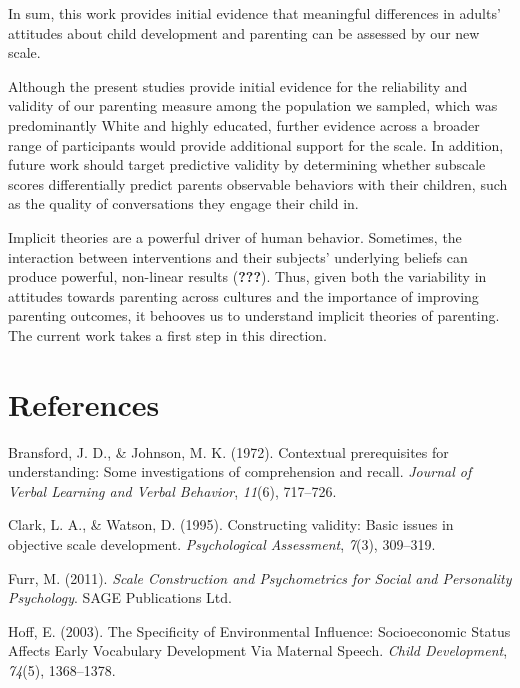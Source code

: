 \documentclass[floatsintext,man]{apa6}
\theoremstyle{definition}
\theoremstyle{definition}
\theoremstyle{definition}
\theoremstyle{remark}
\begin{document}
In sum, this work provides initial evidence that meaningful differences
in adults' attitudes about child development and parenting can be
assessed by our new scale.

Although the present studies provide initial evidence for the
reliability and validity of our parenting measure among the population
we sampled, which was predominantly White and highly educated, further
evidence across a broader range of participants would provide additional
support for the scale. In addition, future work should target predictive
validity by determining whether subscale scores differentially predict
parents observable behaviors with their children, such as the quality of
conversations they engage their child in.

Implicit theories are a powerful driver of human behavior. Sometimes,
the interaction between interventions and their subjects' underlying
beliefs can produce powerful, non-linear results ({\textbf{???}}). Thus,
given both the variability in attitudes towards parenting across
cultures and the importance of improving parenting outcomes, it behooves
us to understand implicit theories of parenting. The current work takes
a first step in this direction.

\newpage

\section{References}\label{references}

\begingroup
\setlength{\parindent}{-0.5in} \setlength{\leftskip}{0.5in}

\hypertarget{refs}{}
\hypertarget{ref-bransford1972}{}
Bransford, J. D., \& Johnson, M. K. (1972). Contextual prerequisites for
understanding: Some investigations of comprehension and recall.
\emph{Journal of Verbal Learning and Verbal Behavior}, \emph{11}(6),
717--726.

\hypertarget{ref-clark1995}{}
Clark, L. A., \& Watson, D. (1995). Constructing validity: Basic issues
in objective scale development. \emph{Psychological Assessment},
\emph{7}(3), 309--319.

\hypertarget{ref-furr2011}{}
Furr, M. (2011). \emph{Scale Construction and Psychometrics for Social
and Personality Psychology}. SAGE Publications Ltd.

\hypertarget{ref-hoff2003}{}
Hoff, E. (2003). The Specificity of Environmental Influence:
Socioeconomic Status Affects Early Vocabulary Development Via Maternal
Speech. \emph{Child Development}, \emph{74}(5), 1368--1378.
\end{document}
